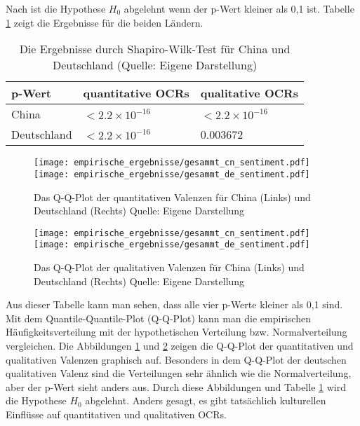 Nach \citet[p.~547]{patrick1995remark} ist die Hypothese $H_0$ abgelehnt wenn der p-Wert kleiner als 0,1 ist. Tabelle \ref{tab:h0_pwert} zeigt die Ergebnisse für die beiden Ländern. 
\begin{table}[htb]
\centering
\begin{tabular}{|l|l|l|}
\hline
p-Wert      & quantitative \ac{OCRs} & qualitative \ac{OCRs}  \\\hline
China       & $<2.2 \times 10^{-16}$ &  $<2.2 \times 10^{-16}$  \\\hline
Deutschland &  $<2.2 \times 10^{-16}$  & 0.003672        \\ \hline
\end{tabular}
\caption[Die Ergebnisse durch Shapiro-Wilk-Test für China und Deutschland]{Die Ergebnisse durch Shapiro-Wilk-Test für China und Deutschland (Quelle: Eigene Darstellung)}
\label{tab:h0_pwert}
\end{table}
\begin{figure}[htb]
    \texttt{[image: empirische\_ergebnisse/gesammt\_cn\_sentiment.pdf]}
    \endminipage\hfill
    \texttt{[image: empirische\_ergebnisse/gesammt\_de\_sentiment.pdf]}
    \endminipage        
\caption[Das Q-Q-Plot der quantitativen Valenzen für China und Deutschland]{Das Q-Q-Plot der quantitativen Valenzen für China (Links) und Deutschland (Rechts) Quelle: Eigene Darstellung}
\label{fig:qqplot_quantitativ}
\end{figure}
\begin{figure}[htb]
    \texttt{[image: empirische\_ergebnisse/gesammt\_cn\_sentiment.pdf]}
    \endminipage\hfill
    \texttt{[image: empirische\_ergebnisse/gesammt\_de\_sentiment.pdf]}
    \endminipage        
\caption[Das Q-Q-Plot der qualitativen Valenzen für China und Deutschland]{Das Q-Q-Plot der qualitativen Valenzen für China (Links) und Deutschland (Rechts) Quelle: Eigene Darstellung}
\label{fig:qqplot_qualitativ}
\end{figure}

Aus dieser Tabelle kann man sehen, dass alle vier p-Werte kleiner als 0,1 sind. Mit dem Quantile-Quantile-Plot (Q-Q-Plot) kann man die empirischen Häufigkeitsverteilung mit der hypothetischen Verteilung \ac{bzw.} Normalverteilung vergleichen. Die Abbildungen \ref{fig:qqplot_quantitativ} und \ref{fig:qqplot_qualitativ} zeigen die Q-Q-Plot der quantitativen und qualitativen Valenzen graphisch auf. Besonders in dem Q-Q-Plot der deutschen qualitativen Valenz sind die Verteilungen sehr ähnlich wie die Normalverteilung, aber der p-Wert sieht anders aus. Durch diese Abbildungen und Tabelle \ref{tab:h0_pwert} wird die Hypothese $H_0$ abgelehnt. Anders gesagt, es gibt tatsächlich kulturellen Einflüsse auf quantitativen und qualitativen \acl{OCRs}. 

